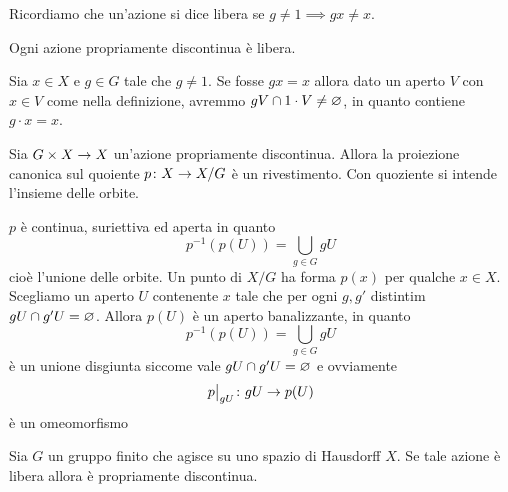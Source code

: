 \documentclass[a4paper]{article}
\begin{document}
Ricordiamo che un'azione si dice libera se
\(g \neq 1 \implies gx \neq x\).

\begin{snippetproposition}{}
    Ogni azione propriamente discontinua è
    libera.
\end{snippetproposition}

\begin{snippetproof}{}
    Sia \(x\in X\) e \(g \in G \)
    tale che \(g \neq 1\). Se fosse \(gx = x\) allora
    dato un aperto \(V\) con \(x\in V\) come nella definizione,
    avremmo \(gV \cap 1 \cdot V \neq \varnothing\),
    in quanto contiene \(g \cdot x = x\).
\end{snippetproof}

\begin{snippettheorem}{}
    Sia \(G \times X \to X\)
    un'azione propriamente discontinua.
    Allora la proiezione canonica sul quoiente
    \(p \colon X \to X/G\)
    è un rivestimento. Con quoziente si intende l'insieme delle orbite.
\end{snippettheorem}

\begin{snippetproof}{}
    \(p\) è continua, suriettiva ed aperta in quanto
    \[
        p^{-1}(p(U)) = \bigcup_{g\in G} g U
    \]
    cioè l'unione delle orbite.
    Un punto di \(X/G\) ha forma \(p(x)\) per qualche \(x\in X\).
    Scegliamo un aperto \(U\) contenente \(x\) tale che 
    per ogni \(g,g'\) distintim \(gU \cap g'U = \varnothing\).
    Allora \(p(U)\) è un aperto banalizzante, in quanto
    \[
        p^{-1}(p(U)) = \bigcup_{g\in G} g U
    \]
    è un unione disgiunta siccome vale \(gU \cap g'U = \varnothing\)
    e ovviamente
    \[
        \restr{p}{gU} \colon gU \fromto p(U)
    \]
    è un omeomorfismo
\end{snippetproof}

\begin{snippetexample}{}
    \todo %
\end{snippetexample}

\begin{snippetexample}{}
    \todo %
\end{snippetexample}

\begin{snippetproposition}{}
    Sia \(G\) un gruppo finito che agisce su uno spazio di Hausdorff \(X\).
    Se tale azione è libera allora è propriamente discontinua.
\end{snippetproposition}
\end{document}
